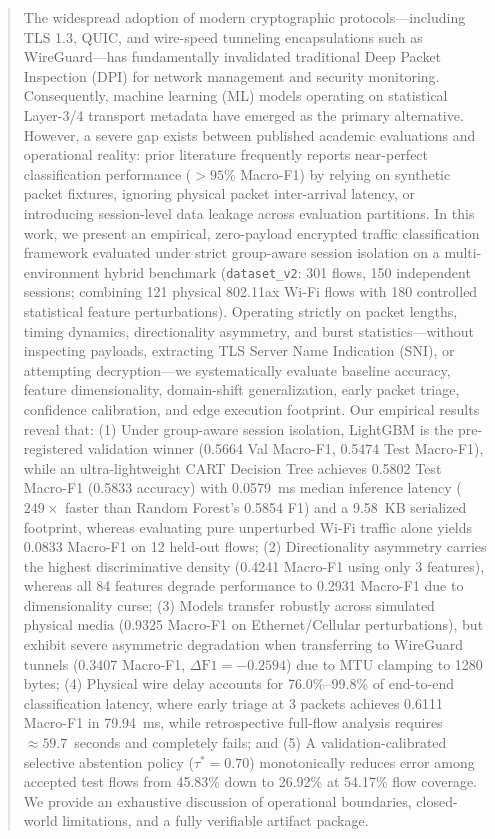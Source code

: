 \documentclass[conference]{IEEEtran}
\begin{document}
\begin{abstract}
The widespread adoption of modern cryptographic protocols---including TLS 1.3, QUIC, and wire-speed tunneling encapsulations such as WireGuard---has fundamentally invalidated traditional Deep Packet Inspection (DPI) for network management and security monitoring. Consequently, machine learning (ML) models operating on statistical Layer-3/4 transport metadata have emerged as the primary alternative. However, a severe gap exists between published academic evaluations and operational reality: prior literature frequently reports near-perfect classification performance ($>95\%$ Macro-F1) by relying on synthetic packet fixtures, ignoring physical packet inter-arrival latency, or introducing session-level data leakage across evaluation partitions. In this work, we present an empirical, zero-payload encrypted traffic classification framework evaluated under strict group-aware session isolation on a multi-environment hybrid benchmark (\texttt{dataset\_v2}: 301 flows, 150 independent sessions; combining 121 physical 802.11ax Wi-Fi flows with 180 controlled statistical feature perturbations). Operating strictly on packet lengths, timing dynamics, directionality asymmetry, and burst statistics---without inspecting payloads, extracting TLS Server Name Indication (SNI), or attempting decryption---we systematically evaluate baseline accuracy, feature dimensionality, domain-shift generalization, early packet triage, confidence calibration, and edge execution footprint. Our empirical results reveal that: (1) Under group-aware session isolation, LightGBM is the pre-registered validation winner (0.5664 Val Macro-F1, 0.5474 Test Macro-F1), while an ultra-lightweight CART Decision Tree achieves 0.5802 Test Macro-F1 (0.5833 accuracy) with 0.0579~ms median inference latency ($249\times$ faster than Random Forest's 0.5854 F1) and a 9.58~KB serialized footprint, whereas evaluating pure unperturbed Wi-Fi traffic alone yields 0.0833 Macro-F1 on 12 held-out flows; (2) Directionality asymmetry carries the highest discriminative density (0.4241 Macro-F1 using only 3 features), whereas all 84 features degrade performance to 0.2931 Macro-F1 due to dimensionality curse; (3) Models transfer robustly across simulated physical media (0.9325 Macro-F1 on Ethernet/Cellular perturbations), but exhibit severe asymmetric degradation when transferring to WireGuard tunnels (0.3407 Macro-F1, $\Delta\text{F1} = -0.2594$) due to MTU clamping to 1280 bytes; (4) Physical wire delay accounts for 76.0\%--99.8\% of end-to-end classification latency, where early triage at 3 packets achieves 0.6111 Macro-F1 in 79.94~ms, while retrospective full-flow analysis requires $\approx 59.7$~seconds and completely fails; and (5) A validation-calibrated selective abstention policy ($\tau^* = 0.70$) monotonically reduces error among accepted test flows from 45.83\% down to 26.92\% at 54.17\% flow coverage. We provide an exhaustive discussion of operational boundaries, closed-world limitations, and a fully verifiable artifact package.
\end{abstract}
\end{document}
